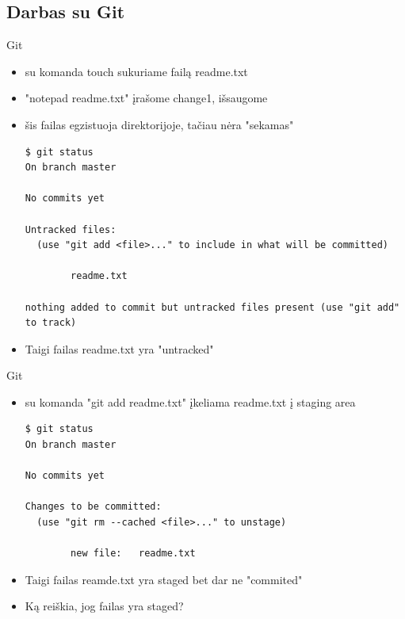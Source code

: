 \documentclass[11pt,xcolor=table]{beamer}
\begin{document}
\subsection{Darbas su Git}

\begin{frame}[fragile]{Git}
\begin{itemize}
\item su komanda touch sukuriame failą readme.txt
\item "notepad readme.txt" įrašome change1, išsaugome 
\item šis failas egzistuoja direktorijoje, tačiau nėra "sekamas"
\begin{lstlisting}
$ git status
On branch master

No commits yet

Untracked files:
  (use "git add <file>..." to include in what will be committed)

        readme.txt

nothing added to commit but untracked files present (use "git add" to track)
\end{lstlisting}
\item Taigi failas readme.txt yra "untracked"
\end{itemize}
\end{frame}


\begin{frame}[fragile]{Git}
\begin{itemize}
\item su komanda "git add readme.txt" įkeliama readme.txt į staging area
\begin{lstlisting}
$ git status
On branch master

No commits yet

Changes to be committed:
  (use "git rm --cached <file>..." to unstage)

        new file:   readme.txt

\end{lstlisting}
\item Taigi failas reamde.txt yra staged bet dar ne "commited"
\item Ką reiškia, jog failas yra staged?
\end{itemize}
\end{frame}
\end{document}

